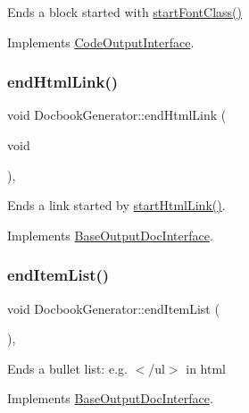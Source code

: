Ends a block started with \mbox{\hyperlink{class_docbook_generator_a899bafb067d2ad8cf7d834e23af83d91}{start\+Font\+Class()}} 

Implements \mbox{\hyperlink{class_code_output_interface_a2b8ac05a391dae36793aa3aa8714a0f6}{Code\+Output\+Interface}}.

\mbox{\label{class_docbook_generator_a14123926fa57e6c0e8dbbbac55f368df}} 
\subsubsection{\texorpdfstring{endHtmlLink()}{endHtmlLink()}}
{\footnotesize\ttfamily void Docbook\+Generator\+::end\+Html\+Link (\begin{DoxyParamCaption}\item[{void}]{ }\end{DoxyParamCaption})\hspace{0.3cm}{\ttfamily [inline]}, {\ttfamily [virtual]}}

Ends a link started by \mbox{\hyperlink{class_docbook_generator_adf4463cfec2c9d8ca083367f2e4afeff}{start\+Html\+Link()}}. 

Implements \mbox{\hyperlink{class_base_output_doc_interface_afb808c1c487135d4fb2156d0675b387e}{Base\+Output\+Doc\+Interface}}.

\mbox{\label{class_docbook_generator_a5e463c37de0b0473855605fe5cf44071}} 
\subsubsection{\texorpdfstring{endItemList()}{endItemList()}}
{\footnotesize\ttfamily void Docbook\+Generator\+::end\+Item\+List (\begin{DoxyParamCaption}{ }\end{DoxyParamCaption})\hspace{0.3cm}{\ttfamily [inline]}, {\ttfamily [virtual]}}

Ends a bullet list\+: e.\+g. {\ttfamily $<$/ul$>$} in html 

Implements \mbox{\hyperlink{class_base_output_doc_interface_a3493b65672bf134033bd3bb296acdff4}{Base\+Output\+Doc\+Interface}}.

